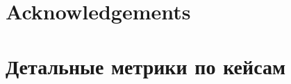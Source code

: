\documentclass{article}
\begin{document}
\section*{Acknowledgements}


\section{Детальные метрики по кейсам}

\setcounter{table}{1}


\end{document}
